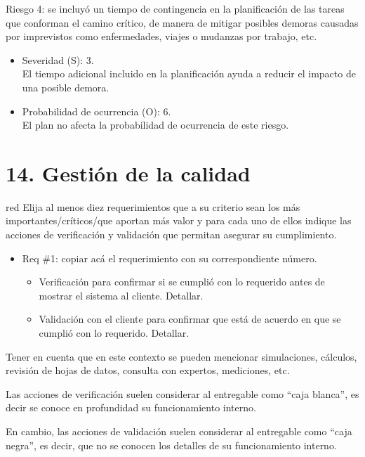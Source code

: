 \documentclass[
11pt, %
]{charter}
\begin{document}
Riesgo 4: se incluyó un tiempo de contingencia en la planificación de las tareas que conforman el camino crítico, de manera de mitigar posibles demoras causadas por imprevistos como enfermedades, viajes o mudanzas por trabajo, etc.
\begin{itemize}
	\item Severidad (S): 3. \\
	El tiempo adicional incluido en la planificación ayuda a reducir el impacto de una posible demora.
	\item Probabilidad de ocurrencia (O): 6.\\
	El plan no afecta la probabilidad de ocurrencia de este riesgo.
\end{itemize}   


\section{14. Gestión de la calidad}
\label{sec:calidad}

\begin{consigna}{red}
Elija al menos diez requerimientos que a su criterio sean los más importantes/críticos/que aportan más valor y para cada uno de ellos indique las acciones de verificación y validación que permitan asegurar su cumplimiento.

\begin{itemize} 
\item Req \#1: copiar acá el requerimiento con su correspondiente número.

\begin{itemize}
	\item Verificación para confirmar si se cumplió con lo requerido antes de mostrar el sistema al cliente. Detallar.
	\item Validación con el cliente para confirmar que está de acuerdo en que se cumplió con lo requerido. Detallar. 
\end{itemize}

\end{itemize}

Tener en cuenta que en este contexto se pueden mencionar simulaciones, cálculos, revisión de hojas de datos, consulta con expertos, mediciones, etc.  

Las acciones de verificación suelen considerar al entregable como ``caja blanca'', es decir se conoce en profundidad su funcionamiento interno.  

En cambio, las acciones de validación suelen considerar al entregable como ``caja negra'', es decir, que no se conocen los detalles de su funcionamiento interno.

\end{consigna}
\end{document}

